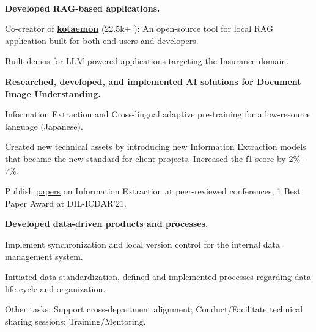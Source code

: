 \\
\vspace{-.2em}
\begin{xitemize}
    \item \textbf{Developed RAG-based applications.}
    \begin{zitemize}
\item Co-creator of \href{https://github.com/Cinnamon/kotaemon}{\textbf{kotaemon}}
(22.5k+ {\scriptsize \faStar}): An
        open-source tool for local RAG application built for both end users and developers.
        \item Built demos for LLM-powered applications targeting the Insurance domain.
    \end{zitemize}
    \item \textbf{Researched, developed, and implemented AI solutions for Document Image Understanding.}
    \begin{zitemize}
        \item Information Extraction and Cross-lingual adaptive pre-training for a
        low-resource language (Japanese).
        \item Created new technical assets by introducing new Information Extraction models that
        became the new standard for client projects. Increased the f1-score by 2\% - 7\%.
        \item Publish \href{https://scholar.google.com/citations?user=\gscholarid}{papers} on
        Information Extraction at peer-reviewed conferences, 1 Best Paper Award
        at DIL-ICDAR'21.
    \end{zitemize}
    \item \textbf{Developed data-driven products and processes.}
    \begin{zitemize}
        \item Implement synchronization and local version control for the internal
        data management system.
        \item Initiated data standardization, defined and implemented processes regarding data life cycle and organization.
    \end{zitemize}
    \item Other tasks: Support cross-department alignment; Conduct/Facilitate technical sharing sessions; Training/Mentoring.
\end{xitemize}

